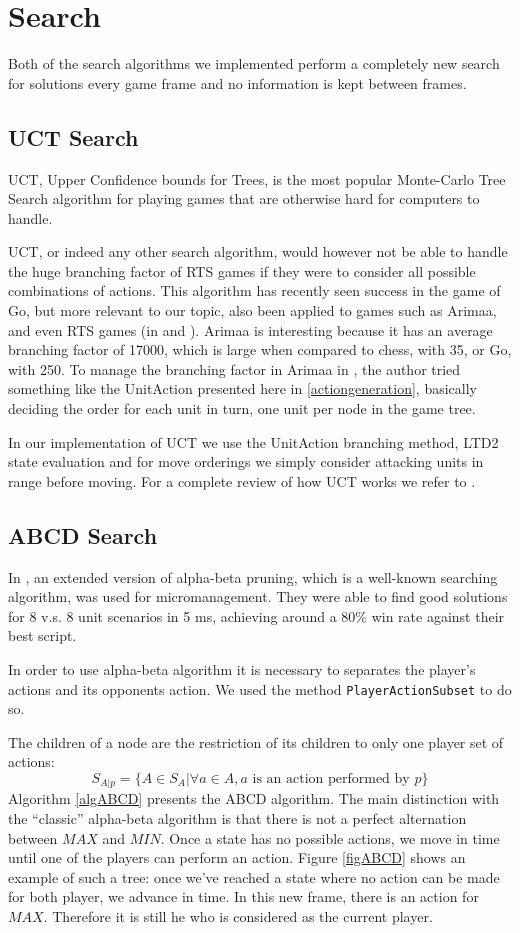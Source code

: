 \section{Search}
Both of the search algorithms we implemented perform a completely new search for solutions every game frame and no information is kept between frames.

\subsection{UCT Search}
UCT, Upper Confidence bounds for Trees, is the most popular Monte-Carlo Tree Search algorithm for playing games that are otherwise hard for computers to handle. \cite{mcts}

UCT, or indeed any other search algorithm, would however not be able to handle the huge branching factor of RTS games if they were to consider all possible combinations of actions.
This algorithm has recently seen success in the game of Go, but more relevant to our topic, also been applied to games such as Arimaa, and even RTS games (in \cite{portfolio} and \cite{wargusuct}).
Arimaa is interesting because it has an average branching factor of 17000, which is large when compared to chess, with 35, or Go, with 250.
To manage the branching factor in Arimaa in \cite{arimaa}, the author tried something like the UnitAction presented here in \ref{actiongeneration}, basically deciding the order for each unit in turn, one unit per node in the game tree.

In our implementation of UCT we use the UnitAction branching method, LTD2 state evaluation and for move orderings we simply consider attacking units in range before moving.
For a complete review of how UCT works we refer to \cite{mcts}.

\subsection{ABCD Search}
In \cite{abcd}, an extended version of alpha-beta pruning, which is a well-known searching algorithm, was used for micromanagement. 
They were able to find good solutions for 8 v.s. 8 unit scenarios in 5 ms, achieving around a 80\% win rate against their best script.

In order to use alpha-beta algorithm it is necessary to separates the player's actions and its opponents action. We used the method \texttt{PlayerActionSubset} to do so. 

The children of a node are the restriction of its children to only one player set of actions:
$$
S_{A|p} = \{A \in S_A | \forall a \in A, a \text{ is an action performed by $p$}\}
$$
Algorithm \ref{algABCD} presents the ABCD algorithm.
The main distinction with the ``classic'' alpha-beta algorithm is that there is not a perfect alternation between $MAX$ and $MIN$. Once a state has no possible actions, we move in time until one of the players can perform an action. 
Figure \ref{figABCD} shows an example of such a tree: once we've reached a state where no action can be made for both player, we advance in time. In this new frame, there is an action for $MAX$. Therefore it is still he who is considered as the current player.

